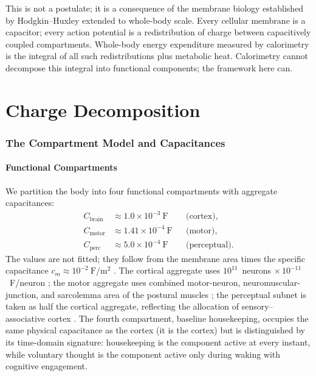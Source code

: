 \documentclass[11pt,twocolumn,a4paper]{article}
\theoremstyle{definition}
\theoremstyle{remark}
\newcommand{\Cbrain}{C_{\mathrm{brain}}}
\newcommand{\Cmotor}{C_{\mathrm{motor}}}
\newcommand{\Cperc}{C_{\mathrm{perc}}}
\begin{document}
This is not a postulate; it is a consequence of the membrane biology
established by Hodgkin--Huxley \citep{hodgkin1952} extended to whole-body
scale. Every cellular membrane is a capacitor; every action potential
is a redistribution of charge between capacitively coupled
compartments. Whole-body energy expenditure measured by calorimetry
\citep{weir1949} is the integral of all such redistributions plus
metabolic heat. Calorimetry cannot decompose this integral into
functional components; the framework here can.

\part{Charge Decomposition}

\section{The Compartment Model and Capacitances}
\label{sec:circuit}

\subsection{Functional Compartments}

We partition the body into four functional compartments with
aggregate capacitances:
\begin{align}
\Cbrain &\approx 1.0 \times 10^{-3}~\mathrm{F} && \text{(cortex)}, \\
\Cmotor &\approx 1.41 \times 10^{-4}~\mathrm{F} && \text{(motor)}, \\
\Cperc &\approx 5.0 \times 10^{-4}~\mathrm{F} && \text{(perceptual)}.
\end{align}
The values are not fitted; they follow from the membrane area times
the specific capacitance $c_m \approx 10^{-2}~\mathrm{F/m^2}$
\citep{cole1941, gentet2000}. The cortical aggregate uses
$10^{11}$~neurons $\times \, 10^{-11}$~F/neuron \citep{kandel2013}; the
motor aggregate uses combined motor-neuron, neuromuscular-junction,
and sarcolemma area of the postural muscles \citep{purves2018}; the
perceptual subnet is taken as half the cortical aggregate, reflecting
the allocation of sensory--associative cortex \citep{zeki1993,
koch2004}. The fourth compartment, baseline housekeeping, occupies the
same physical capacitance as the cortex (it is the cortex) but is
distinguished by its time-domain signature: housekeeping is the
component active at every instant, while voluntary thought is the
component active only during waking with cognitive engagement.
\end{document}
